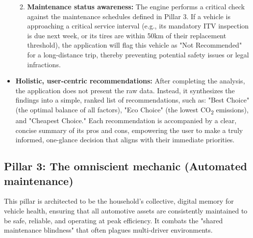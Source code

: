 \begin{itemize}
\begin{enumerate}
        \textgap
        
        \item \textbf{Maintenance status awareness:} The engine performs a critical check against the maintenance schedules defined in Pillar 3. If a vehicle is approaching a critical service interval (e.g., its mandatory ITV inspection is due next week, or its tires are within 50km of their replacement threshold), the application will flag this vehicle as "Not Recommended" for a long-distance trip, thereby preventing potential safety issues or legal infractions.
    \end{enumerate}

    \textgap

    \item \textbf{Holistic, user-centric recommendations:} After completing the analysis, the application does not present the raw data. Instead, it synthesizes the findings into a simple, ranked list of recommendations, such as: "Best Choice" (the optimal balance of all factors), "Eco Choice" (the lowest CO\textsubscript{2} emissions), and "Cheapest Choice." Each recommendation is accompanied by a clear, concise summary of its pros and cons, empowering the user to make a truly informed, one-glance decision that aligns with their immediate priorities.
\end{itemize}

\subsection{Pillar 3: The omniscient mechanic (Automated maintenance)}

This pillar is architected to be the household's collective, digital memory for vehicle health, ensuring that all automotive assets are consistently maintained to be safe, reliable, and operating at peak efficiency. It combats the "shared maintenance blindness" that often plagues multi-driver environments.

\textgap

